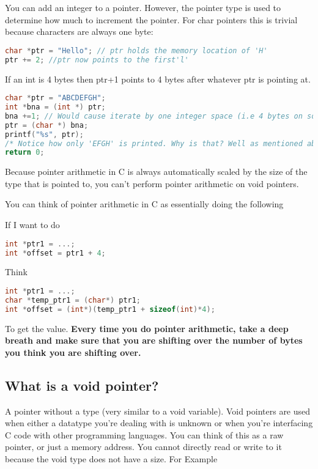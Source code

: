 You can add an integer to a pointer. However, the pointer type is used
to determine how much to increment the pointer. For char pointers this
is trivial because characters are always one byte:

\begin{lstlisting}[language=C]
char *ptr = "Hello"; // ptr holds the memory location of 'H'
ptr += 2; //ptr now points to the first'l'
\end{lstlisting}

If an int is 4 bytes then ptr+1 points to 4 bytes after whatever ptr is
pointing at.

\begin{lstlisting}[language=C]
char *ptr = "ABCDEFGH";
int *bna = (int *) ptr;
bna +=1; // Would cause iterate by one integer space (i.e 4 bytes on some systems)
ptr = (char *) bna;
printf("%s", ptr);
/* Notice how only 'EFGH' is printed. Why is that? Well as mentioned above, when performing 'bna+=1' we are increasing the **integer** pointer by 1, (translates to 4 bytes on most systems) which is equivalent to 4 characters (each character is only 1 byte)*/
return 0;
\end{lstlisting}

Because pointer arithmetic in C is always automatically scaled by the
size of the type that is pointed to, you can't perform pointer
arithmetic on void pointers.

You can think of pointer arithmetic in C as essentially doing the
following

If I want to do

\begin{lstlisting}[language=C]
int *ptr1 = ...;
int *offset = ptr1 + 4;
\end{lstlisting}

Think

\begin{lstlisting}[language=C]
int *ptr1 = ...;
char *temp_ptr1 = (char*) ptr1;
int *offset = (int*)(temp_ptr1 + sizeof(int)*4);
\end{lstlisting}

To get the value. \textbf{Every time you do pointer arithmetic, take a
deep breath and make sure that you are shifting over the number of bytes
you think you are shifting over.}

\subsection{What is a void pointer?}

A pointer without a type (very similar to a void variable). Void pointers are used when either a datatype you're dealing with is unknown or when you're interfacing C code with other programming languages. You can think of this as a raw pointer, or just a memory address. You cannot directly read or write to it because the void type does not have a size. For Example


